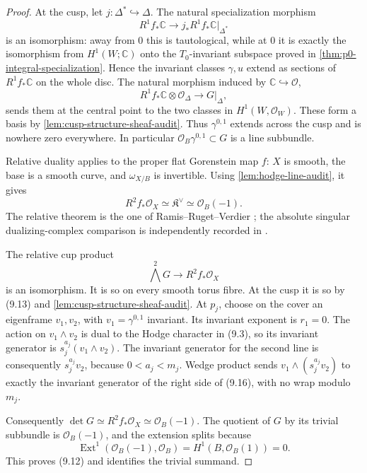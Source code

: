 \begin{proof}
At the cusp, let \(j:\Delta^*\hookrightarrow\Delta\).  The natural
specialization morphism
\[
 R^1f_*\mathbb C\longrightarrow
 j_*R^1f_*\mathbb C|_{\Delta^*}
\]
is an isomorphism: away from \(0\) this is tautological, while at \(0\) it
is exactly the isomorphism from \(H^1(W;\mathbb C)\) onto the
\(T_0\)-invariant subspace proved in
\cref{thm:p0-integral-specialization}.  Hence the invariant classes
\(\gamma,u\) extend as sections of \(R^1f_*\mathbb C\) on the whole disc.
The natural morphism induced by \(\mathbb C\hookrightarrow\mathcal O\),
\[
 R^1f_*\mathbb C\otimes\mathcal O_\Delta
 \longrightarrow G|_\Delta,
\]
sends them at the central point to the two classes in
\(H^1(W,\mathcal O_W)\).  These form a basis by
\cref{lem:cusp-structure-sheaf-audit}.  Thus
\(\gamma^{0,1}\) extends across the cusp and is nowhere zero everywhere.
In particular \(\mathcal O_B\gamma^{0,1}\subset G\) is a line subbundle.

Relative duality applies to the proper flat Gorenstein map \(f\): \(X\) is
smooth, the base is a smooth curve, and \(\omega_{X/B}\) is invertible.
Using \cref{lem:hodge-line-audit}, it gives
\[
 R^2f_*\mathcal O_X\simeq\mathfrak K^\vee
 \simeq\mathcal O_B(-1).
\tag{9.15}
\]
The relative theorem is the one of Ramis--Ruget--Verdier
\cite[pp.~261--283]{RamisRugetVerdier1971}; the absolute singular
dualizing-complex comparison is independently recorded in
\cite[Theorems~1--2 and Proposition~2]{RamisRuget1970}.

The relative cup product
\[
 \bigwedge^2G\longrightarrow R^2f_*\mathcal O_X
\tag{9.16}
\]
is an isomorphism.  It is so on every smooth torus fibre.  At the cusp it
is so by (9.13) and \cref{lem:cusp-structure-sheaf-audit}.  At \(p_j\),
choose on the cover an eigenframe \(v_1,v_2\), with
\(v_1=\gamma^{0,1}\) invariant.  Its invariant exponent is \(r_1=0\).
The action on \(v_1\wedge v_2\) is dual to the Hodge character in (9.3),
so its invariant generator is \(s_j^{a_j}(v_1\wedge v_2)\).
The invariant generator for the second line is consequently
\(s_j^{a_j}v_2\), because \(0<a_j<m_j\).  Wedge product sends
\(v_1\wedge(s_j^{a_j}v_2)\) to exactly the invariant generator of the
right side of (9.16), with no wrap modulo \(m_j\).

Consequently
\(\det G\simeq R^2f_*\mathcal O_X\simeq\mathcal O_B(-1)\).  The quotient
of \(G\) by its trivial subbundle is \(\mathcal O_B(-1)\), and the
extension splits because
\[
 \operatorname{Ext}^1(\mathcal O_B(-1),\mathcal O_B)
 =H^1(B,\mathcal O_B(1))=0.
\]
This proves (9.12) and identifies the trivial summand.
\end{proof}

